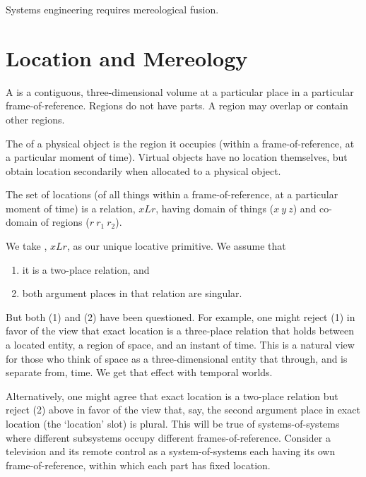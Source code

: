 \pn Systems engineering requires mereological fusion.




\section{Location and Mereology}\label{sec:location-mereology}

\pn A  is a contiguous, three-dimensional volume at a particular place in a particular 
frame-of-reference.\cite{location-mereology}
Regions do not have parts.  A region may overlap or contain other regions.

\pn The  of a physical object is the region it occupies (within a frame-of-reference, at a particular moment of time).
Virtual objects have no location themselves, but obtain location secondarily when allocated to a physical object.

\pn The set of locations (of all things within a frame-of-reference, at a particular moment of time) is a relation, $xLr$, having
domain of things ($x~ y~ z$) and co-domain of regions ($r~ r_1~ r_2$).

\pn We take , $xLr$, as our unique locative primitive. We assume that
\begin{enumerate}
\item it is a two-place relation, and
\item both argument places in that relation are singular.
\end{enumerate}

\pn But both (1) and (2) have been questioned.
For example, one might reject (1) in favor of the view that exact location is a three-place relation that holds between a located entity, a region of space, and an instant of time. This is a natural view for those who think of space as a three-dimensional entity that 
 through, and is separate from, time.  We get that effect with temporal worlds.

\pn Alternatively, one might agree that exact location is a two-place relation but reject (2) above in favor of the view that, say, the second argument place in exact location (the ‘location’ slot) is plural.  This will be true of systems-of-systems where different subsystems occupy different frames-of-reference.  Consider a television and its remote control as a system-of-systems each having its own frame-of-reference, within which each part has fixed location.

